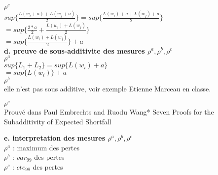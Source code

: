 \textbf{$\rho^c$}\\
$sup\{\frac{L(w_i+a)+L(w_j+a)}{2}\} = sup\{\frac{L(w_i)+a+L(w_j)+a}{2}\}$\\
$ = sup\{\frac{2*a}{2} + \frac{L(w_i)+L(w_j)}{2}\}$\\
$ = sup\{ \frac{L(w_i)+L(w_j)}{2}\} + a$\\

\textbf{d. preuve de sous-additivite des mesures $\rho^a, \rho^b, \rho^c$}\\
\textbf{$\rho^a$}\\
$sup\{L_1 + L_2\} = sup\{L(w_i)+a\}$\\
$ = sup\{L(w_i)\} + a$\\

\textbf{$\rho^b$}\\
elle n'est pas sous additive, voir exemple Etienne Marceau en classe.

\textbf{$\rho^c$}\\
Prouvé dans Paul Embrechts and Ruodu Wang* Seven Proofs for the Subadditivity of Expected Shortfall


\textbf{e. interpretation des mesures $\rho^a, \rho^b, \rho^c$}\\
$\rho^a$ : maximum des pertes\\
$\rho^b$ : $var_{99}$ des pertes\\
$\rho^c$ : $cte_{98}$ des pertes\\

